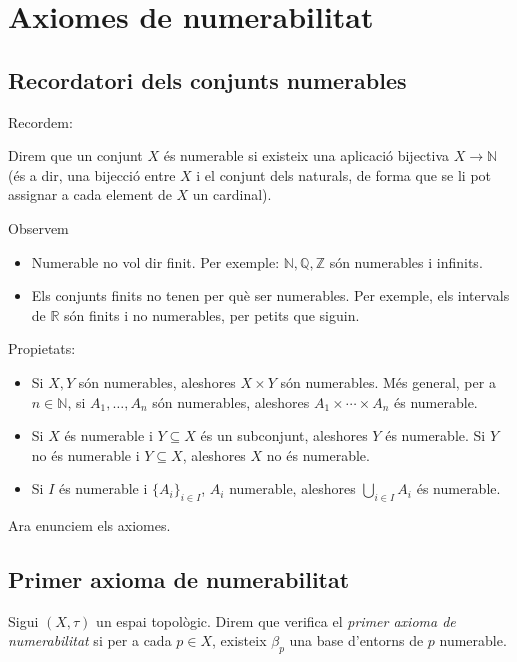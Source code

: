 \documentclass[../main.tex]{subfiles}
\begin{document}
\section{Axiomes de numerabilitat}
\subsection{Recordatori dels conjunts numerables}
Recordem:
\begin{defi}
\label{def:numerable} Direm que un conjunt $X$ és numerable si existeix una aplicació bijectiva $X\rightarrow \mathbb{N}$ (és a dir, una bijecció entre $X$ i el conjunt dels naturals, de forma que se li pot assignar a cada element de $X$ un cardinal).
\end{defi}

\begin{nota}
\label{nota:numerable} Observem
\begin{itemize}
    \item Numerable no vol dir finit. Per exemple: $\mathbb{N}, \mathbb{Q}, \mathbb{Z}$ són numerables i infinits.
    \item Els conjunts finits no tenen per què ser numerables. Per exemple, els intervals de $\mathbb{R}$ són finits i no numerables, per petits que siguin.
\end{itemize}
\end{nota}

\begin{prop}
\label{prop:propietatsnumerable} Propietats:
\begin{itemize}
    \item Si $X,Y$ són numerables, aleshores $X\times Y$ són numerables. Més general, per a $n\in\mathbb{N}$, si $A_1,\ldots,A_n$ són numerables, aleshores $A_1\times \cdots\times A_n$ és numerable.
    \item Si $X$ és numerable i $Y\subseteq X$ és un subconjunt, aleshores $Y$ és numerable. Si $Y$ no és numerable i $Y\subseteq X$, aleshores $X$ no és numerable.
    \item Si $I$ és numerable i $\{A_i\}_{i\in I}$, $A_i$ numerable, aleshores $\bigcup_{i\in I}A_i$ és numerable.
\end{itemize}
\end{prop}

Ara enunciem els axiomes.

\subsection{Primer axioma de numerabilitat}
\begin{defi}
\label{def:1an} Sigui $(X,\tau)$ un espai topològic. Direm que verifica el \textit{primer axioma de numerabilitat} si  per a cada $p\in X$, existeix $\beta_p$ una base d'entorns de $p$ numerable.
\end{defi}
\end{document}
